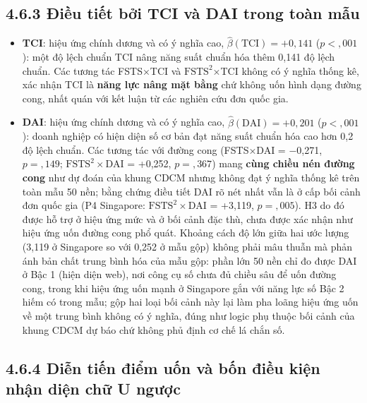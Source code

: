 \documentclass[
  a4paper,
  13pt]{extreport}
\providecommand{\tightlist}{%
  \setlength{\itemsep}{0pt}\setlength{\parskip}{0pt}}
\begin{document}
\hypertarget{ux111iux1ec1u-tiux1ebft-bux1edfi-tci-vuxe0-dai-trong-touxe0n-mux1eabu}{%
\subsection{4.6.3 Điều tiết bởi TCI và DAI trong toàn
mẫu}\label{ux111iux1ec1u-tiux1ebft-bux1edfi-tci-vuxe0-dai-trong-touxe0n-mux1eabu}}

\begin{itemize}
\tightlist
\item
  \textbf{TCI}: hiệu ứng chính dương và có ý nghĩa cao,
  \(\hat{\beta}(\text{TCI}) = +0{,}141\) (\(p < {,}001\)): một độ lệch
  chuẩn TCI nâng năng suất chuẩn hóa thêm 0,141 độ lệch chuẩn. Các tương
  tác FSTS×TCI và \(\text{FSTS}^2\)×TCI không có ý nghĩa thống kê, xác
  nhận TCI là \textbf{năng lực nâng mặt bằng} chứ không uốn hình dạng
  đường cong, nhất quán với kết luận từ các nghiên cứu đơn quốc gia.
\item
  \textbf{DAI}: hiệu ứng chính dương và có ý nghĩa cao,
  \(\hat{\beta}(\text{DAI}) = +0{,}201\) (\(p < {,}001\)): doanh nghiệp
  có hiện diện số cơ bản đạt năng suất chuẩn hóa cao hơn 0,2 độ lệch
  chuẩn. Các tương tác với đường cong (FSTS×DAI = −0,271,
  \(p = {,}149\); \(\text{FSTS}^2 \times \text{DAI}\) = +0,252,
  \(p = {,}367\)) mang \textbf{cùng chiều nén đường cong} như dự đoán
  của khung CDCM nhưng không đạt ý nghĩa thống kê trên toàn mẫu 50 nền;
  bằng chứng điều tiết DAI rõ nét nhất vẫn là ở cấp bối cảnh đơn quốc
  gia (P4 Singapore: \(\text{FSTS}^2 \times \text{DAI}\) = +3,119,
  \(p = {,}005\)). H3 do đó được hỗ trợ ở hiệu ứng mức và ở bối cảnh đặc
  thù, chưa được xác nhận như hiệu ứng uốn đường cong phổ quát. Khoảng
  cách độ lớn giữa hai ước lượng (3,119 ở Singapore so với 0,252 ở mẫu
  gộp) không phải mâu thuẫn mà phản ánh bản chất trung bình hóa của mẫu
  gộp: phần lớn 50 nền chỉ đo được DAI ở Bậc 1 (hiện diện web), nơi công
  cụ số chưa đủ chiều sâu để uốn đường cong, trong khi hiệu ứng uốn mạnh
  ở Singapore gắn với năng lực số Bậc 2 hiếm có trong mẫu; gộp hai loại
  bối cảnh này lại làm pha loãng hiệu ứng uốn về một trung bình không có
  ý nghĩa, đúng như logic phụ thuộc bối cảnh của khung CDCM dự báo chứ
  không phủ định cơ chế lá chắn số.
\end{itemize}

\hypertarget{diux1ec5n-tiux1ebfn-ux111iux1ec3m-uux1ed1n-vuxe0-bux1ed1n-ux111iux1ec1u-kiux1ec7n-nhux1eadn-diux1ec7n-chux1eef-u-ngux1b0ux1ee3c}{%
\subsection{4.6.4 Diễn tiến điểm uốn và bốn điều kiện nhận diện chữ U
ngược}\label{diux1ec5n-tiux1ebfn-ux111iux1ec3m-uux1ed1n-vuxe0-bux1ed1n-ux111iux1ec1u-kiux1ec7n-nhux1eadn-diux1ec7n-chux1eef-u-ngux1b0ux1ee3c}}
\end{document}
